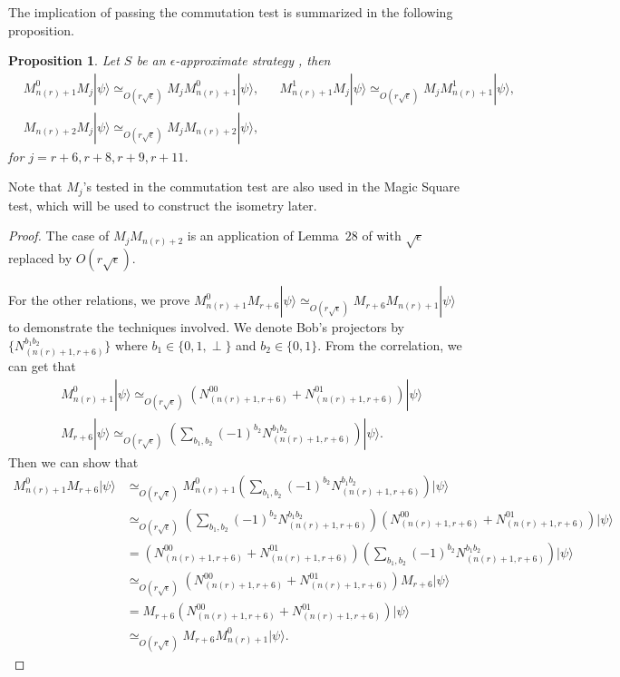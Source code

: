 \documentclass[11pt,letterpaper]{article}
\newcommand{\ket}[1]{|#1\rangle}
\newcommand{\1}{\mathbb{1}}
\newcommand{\nr}{n(r)}
\newcommand{\ep}{\epsilon}
\newcommand{\se}{\sqrt{\epsilon}}
\newcommand{\appd}[1]{\simeq_{#1}}
\newtheorem{proposition}[theorem]{Proposition}
\theoremstyle{definition}
\begin{document}
The implication of passing the commutation test is summarized in the following proposition.
\begin{proposition}
	\label{prop:rel_comm}
	Let $S$ be an $\ep$-approximate strategy ,
	then 
	\begin{align}
		&M_{\nr+1}^0 M_j \ket{\psi} \appd{O(r\se)} M_{j} M_{\nr+1}^0 \ket{\psi}, &&
		M_{\nr+1}^1 M_j \ket{\psi} \appd{O(r\se)} M_{j} M_{\nr+1}^1 \ket{\psi}, \\
		&M_{\nr+2} M_j \ket{\psi} \appd{O(r\se)} M_j M_{\nr+2} \ket{\psi},
	\end{align}
	for $j = r+6, r+8,r+9,r+11$.
\end{proposition}
Note that $M_j$'s tested in the commutation test are also used in the Magic Square test,
which will be used to construct the isometry later.
\begin{proof}
	The case of $M_j M_{\nr+2}$ is an application of Lemma~$28$ of \cite{coladan2017verifier} with $\se$ replaced by $O(r\se)$.
	
	For the other relations, we prove $M_{\nr+1}^0M_{r+6} \ket{\psi} \appd{O(r\se)} M_{r+6}M_{\nr+1} \ket{\psi}$ to demonstrate 
	the techniques involved. We denote Bob's projectors by $\{ N_{(\nr+1, r+6)}^{b_1 b_2} \}$ where $b_1 \in \{0, 1, \perp\}$ and
	$b_2 \in \{0,1\}$. From the correlation, we can get that 
	\begin{align*}
		&M_{\nr+1}^0 \ket{\psi} \appd{O(r\se)} (N_{(\nr+1, r+6)}^{00} + N_{(\nr+1, r+6)}^{01}) \ket{\psi} \\
		&M_{r+6} \ket{\psi} \appd{O(r\se)} (\sum_{b_1, b_2} (-1)^{b_2}N_{(\nr+1, r+6)}^{b_1b_2})\ket{\psi}.
	\end{align*}
	Then we can show that
	\begin{align*}
		M_{\nr+1}^0 M_{r+6} \ket{\psi} &\appd{O(r\se)} M_{\nr+1}^0 (\sum_{b_1, b_2} (-1)^{b_2}N_{(\nr+1, r+6)}^{b_1b_2})\ket{\psi}\\
		&\appd{O(r\se)}(\sum_{b_1, b_2} (-1)^{b_2}N_{(\nr+1, r+6)}^{b_1b_2}) (N_{(\nr+1, r+6)}^{00} + N_{(\nr+1, r+6)}^{01})
		\ket{\psi} \\
		&= (N_{(\nr+1, r+6)}^{00} + N_{(\nr+1, r+6)}^{01}) (\sum_{b_1, b_2} (-1)^{b_2}N_{(\nr+1, r+6)}^{b_1b_2})  \ket{\psi} \\
		& \appd{O(r\se)} (N_{(\nr+1, r+6)}^{00} + N_{(\nr+1, r+6)}^{01}) M_{r+6} \ket{\psi} \\
		&= M_{r+6}  (N_{(\nr+1, r+6)}^{00} + N_{(\nr+1, r+6)}^{01}) \ket{\psi} \\
		& \appd{O(r\se)} M_{r+6}M_{\nr+1}^0 \ket{\psi}.
	\end{align*}
\end{proof}
\end{document}
